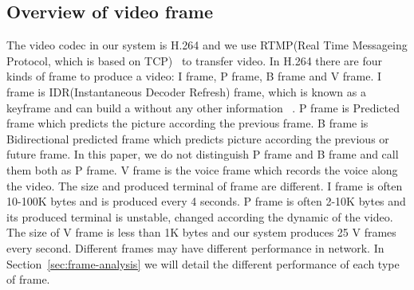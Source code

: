 \subsection{Overview of video frame}
\label{sub:video-frame}
The video codec in our system is H.264 and we use RTMP(Real Time Messageing Protocol, which is based on TCP) ~\cite{zambelli2009iis}to transfer video. In H.264 there are four kinds of frame to produce a video: I frame, P frame, B frame and V frame. I frame is IDR(Instantaneous Decoder Refresh) frame, which is known as a keyframe and can build a without any other information ~\cite{timothy2011h264}.  P frame is Predicted frame which predicts the picture according the previous frame. B frame is Bidirectional predicted frame which predicts picture according the previous or future frame. In this paper, we do not distinguish P frame and B frame and call them both as P frame. V frame is the voice frame which records the voice along the video. The size and produced terminal of frame are different. I frame is often 10-100K bytes and is produced every 4 seconds. P frame is often 2-10K bytes and its produced terminal is unstable, changed according the dynamic of the video. The size of V frame is less than 1K bytes and our system produces 25 V frames every second. Different frames may have different performance in network. In Section~\ref{sec:frame-analysis} we will detail the different performance of each type of frame.



\iffalse
\begin{figure}[ht]
	\centering
	\texttt{[image: frame]}
	\caption{An overview of H.264 frame.}
	\label{fig:frame}
	\termspace
\end{figure}
\fi


 

